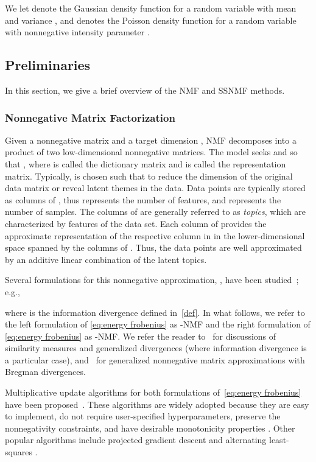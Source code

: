 \documentclass[twocolumn,10pt]{article}
\begin{document}
We let  denote the Gaussian density function for a 
random variable  with mean  and variance , 
and  denotes the Poisson density function for 
a random variable  with nonnegative intensity parameter .

\subsection{Preliminaries}
\label{sec:preliminaries}
In this section, we give a brief overview of the NMF and SSNMF methods.

\subsubsection*{Nonnegative Matrix Factorization}
Given a nonnegative matrix  and a target dimension , NMF decomposes  into a product of two low-dimensional nonnegative matrices.
The model seeks  and  so that ,
where  is called the dictionary matrix and  is called the representation matrix.
Typically,  is chosen such that  to reduce the dimension of the original data matrix or reveal latent themes in the data.
Data points are typically stored as columns of , thus  represents the number of features, and  represents the number of samples.
The columns of  are generally referred to as \emph{topics}, which are characterized by features of the data set.
Each column of  provides the approximate representation of the respective column in  in the lower-dimensional space spanned by the columns of .
Thus, the data points are well approximated by an additive linear combination of the latent topics.

Several formulations for this nonnegative approximation, , have been studied~\cite{cichocki2009nonnegative,lee1999learning,lee2001algorithms,yang2011kullback}; 
e.g.,

where  is the information divergence defined in~\eqref{def}.
In what follows, we refer to the left formulation of \eqref{eq:energy frobenius} as -NMF and the right formulation of \eqref{eq:energy frobenius} as -NMF. We refer the reader to~\cite{cichocki2009nonnegative} for discussions of similarity measures and generalized divergences (where information divergence is a particular case), and~\cite{li2012fast,sra2006generalized} for generalized nonnegative matrix approximations with Bregman divergences. 


Multiplicative update algorithms for both formulations of~\eqref{eq:energy frobenius} have been proposed~\cite{lee1999learning, lee2001algorithms}.
These algorithms are widely adopted because they are easy to implement, do not require
user-specified hyperparameters, preserve the nonnegativity constraints, and have desirable monotonicity properties \cite{lee2001algorithms}. Other popular algorithms include projected gradient descent and alternating least-squares \cite{cichocki2009nonnegative,kim2008fast,kim2008nonnegative,lin2007projected}.
\end{document}
